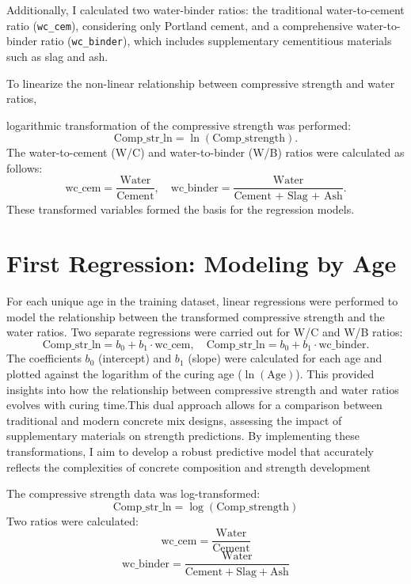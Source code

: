 \documentclass[a4paper,11pt]{article}
\begin{document}
 

Additionally, I calculated two water-binder ratios: the traditional water-to-cement ratio (\texttt{wc\_cem}), considering only Portland cement, and a comprehensive water-to-binder ratio (\texttt{wc\_binder}), which includes supplementary cementitious materials such as slag and ash. 

 


 To linearize the non-linear relationship between compressive strength and water ratios,  


 
logarithmic transformation of the compressive strength was performed:
\[
\text{Comp\_str\_ln} = \ln(\text{Comp\_strength}).
\]
The water-to-cement (W/C) and water-to-binder (W/B) ratios were calculated as follows:
\[
\text{wc\_cem} = \frac{\text{Water}}{\text{Cement}}, \quad \text{wc\_binder} = \frac{\text{Water}}{\text{Cement + Slag + Ash}}.
\]
These transformed variables formed the basis for the regression models.

\section*{First Regression: Modeling by Age}
For each unique age in the training dataset, linear regressions were performed to model the relationship between the transformed compressive strength and the water ratios. Two separate regressions were carried out for W/C and W/B ratios:
\[
\text{Comp\_str\_ln} = b_0 + b_1 \cdot \text{wc\_cem}, \quad \text{Comp\_str\_ln} = b_0 + b_1 \cdot \text{wc\_binder}.
\]
The coefficients \( b_0 \) (intercept) and \( b_1 \) (slope) were calculated for each age and plotted against the logarithm of the curing age (\( \ln(\text{Age}) \)). This provided insights into how the relationship between compressive strength and water ratios evolves with curing time.This dual approach allows for a comparison between traditional and modern concrete mix designs, assessing the impact of supplementary materials on strength predictions. By implementing these transformations, I aim to develop a robust predictive model that accurately reflects the complexities of concrete composition and strength development 
 
 
The compressive strength data was log-transformed:
\[
\text{Comp\_str\_ln} = \log(\text{Comp\_strength})
\]
Two ratios were calculated:
\[
\text{wc\_cem} = \frac{\text{Water}}{\text{Cement}}
\]
\[
\text{wc\_binder} = \frac{\text{Water}}{\text{Cement} + \text{Slag} + \text{Ash}}
\]
\end{document}
